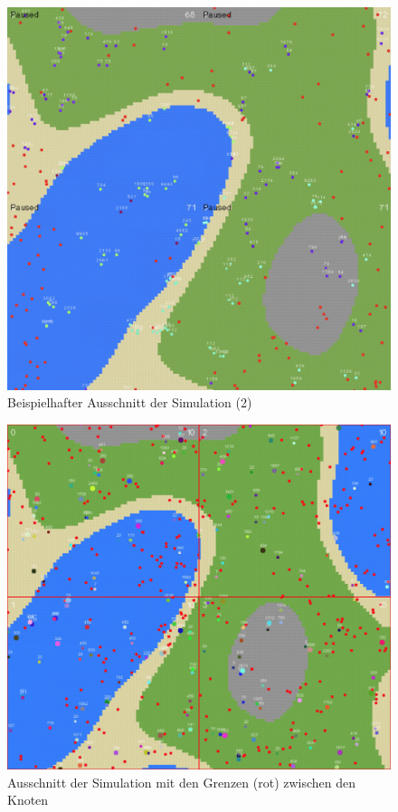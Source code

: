\documentclass[course=erap]{aspdoc}
\begin{document}
\begin{figure}
    \centering
    \includegraphics[width=\textwidth]{res/ergebnisse-simulation-2.png}
    \caption{Beispielhafter Ausschnitt der Simulation (2)}
    \label{fig:ergebnisse-simulation-2}
\end{figure}

\begin{figure}
    \centering
    \includegraphics[width=\textwidth]{res/simulation-borders.png}
    \caption{Ausschnitt der Simulation mit den Grenzen (rot) zwischen den Knoten}
    \label{fig:simulation-borders}
\end{figure}
\end{document}
